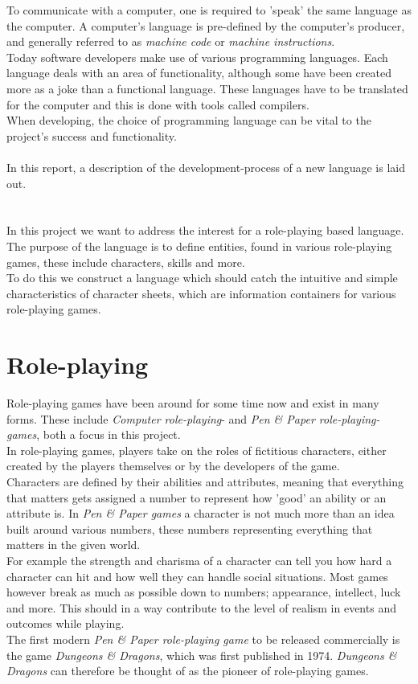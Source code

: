 
To communicate with a computer, one is required to 'speak' the same language as the computer. A computer's language is pre-defined by the computer's producer, and generally referred to as \emph{machine code} or \emph{machine instructions}.\\
Today software developers make use of various programming languages. Each language deals with an area of functionality,  although some have been created more as a joke than a functional language. These languages have to be translated for the computer and this is done with tools called compilers.\\
When developing, the choice of programming language can be vital to the project's success and functionality.\\\\
In this report, a description of the development-process of a new language is laid out.

\section{\langname{}}
In this project we want to address the interest for a role-playing based language. The purpose of the language is to define entities, found in various role-playing games, these include characters, skills and more.\\
To do this we construct a language which should catch the intuitive and simple characteristics of character sheets, which are information containers for various role-playing games.

\section{Role-playing}
Role-playing games have been around for some time now and exist in many forms.
These include \emph{Computer role-playing}- and \emph{Pen \& Paper role-playing-games}, both a focus in this project.\\
In role-playing games, players take on the roles of fictitious characters, either created by the players themselves or by the developers of the game.\\
Characters are defined by their abilities and attributes, meaning that everything that matters gets assigned a number to represent how 'good' an ability or an attribute is. In \emph{Pen \& Paper games} a character is not much more than an idea built around various numbers, these numbers representing everything that matters in the given world.\\ For example the strength and charisma of a character can tell you how hard a character can hit and how well they can handle social situations. Most games however break as much as possible down to numbers; appearance, intellect, luck and more.
This should in a way contribute to the level of realism in events and outcomes while playing.\\
The first modern \emph{Pen \& Paper role-playing game} to be released commercially is the game \emph{Dungeons \& Dragons}, which was first published in 1974.\cite{wikidnd}
\emph{Dungeons \& Dragons} can therefore be thought of as the pioneer of role-playing games.
